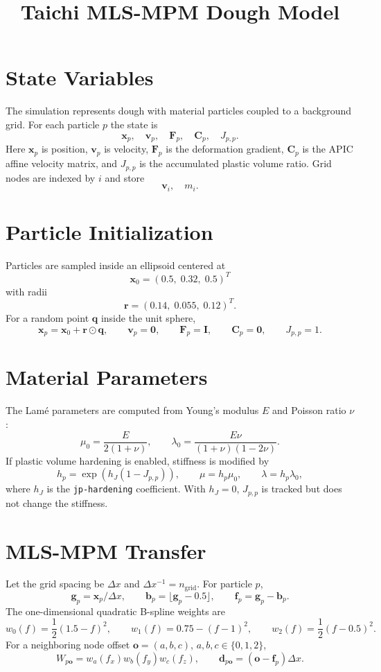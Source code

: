 \documentclass[11pt,a4paper]{article}
\title{Taichi MLS-MPM Dough Model}
\author{}
\date{}
\begin{document}
\maketitle

\section{State Variables}

The simulation represents dough with material particles coupled to a background grid.
For each particle $p$ the state is
\[
  \bm{x}_p,\quad \bm{v}_p,\quad \bm{F}_p,\quad \bm{C}_p,\quad J_{p,p}.
\]
Here $\bm{x}_p$ is position, $\bm{v}_p$ is velocity, $\bm{F}_p$ is the deformation
gradient, $\bm{C}_p$ is the APIC affine velocity matrix, and $J_{p,p}$ is the
accumulated plastic volume ratio. Grid nodes are indexed by $i$ and store
\[
  \bm{v}_i,\quad m_i .
\]

\section{Particle Initialization}

Particles are sampled inside an ellipsoid centered at
\[
  \bm{x}_0 = (0.5,\;0.32,\;0.5)^T
\]
with radii
\[
  \bm{r} = (0.14,\;0.055,\;0.12)^T .
\]
For a random point $\bm{q}$ inside the unit sphere,
\[
  \bm{x}_p = \bm{x}_0 + \bm{r}\odot \bm{q},
  \qquad
  \bm{v}_p = \bm{0},
  \qquad
  \bm{F}_p = \bm{I},
  \qquad
  \bm{C}_p = \bm{0},
  \qquad
  J_{p,p}=1 .
\]

\section{Material Parameters}

The Lam\'e parameters are computed from Young's modulus $E$ and Poisson ratio $\nu$:
\[
  \mu_0 = \frac{E}{2(1+\nu)},
  \qquad
  \lambda_0 = \frac{E\nu}{(1+\nu)(1-2\nu)} .
\]
If plastic volume hardening is enabled, stiffness is modified by
\[
  h_p = \exp\left(h_J(1 - J_{p,p})\right),
  \qquad
  \mu = h_p\mu_0,
  \qquad
  \lambda = h_p\lambda_0 ,
\]
where $h_J$ is the \texttt{jp-hardening} coefficient. With $h_J=0$, $J_{p,p}$
is tracked but does not change the stiffness.

\section{MLS-MPM Transfer}

Let the grid spacing be $\Delta x$ and $\Delta x^{-1} = n_\mathrm{grid}$.
For particle $p$,
\[
  \bm{g}_p = \bm{x}_p / \Delta x,
  \qquad
  \bm{b}_p = \lfloor \bm{g}_p - 0.5 \rfloor,
  \qquad
  \bm{f}_p = \bm{g}_p - \bm{b}_p .
\]
The one-dimensional quadratic B-spline weights are
\[
  w_0(f)=\frac{1}{2}(1.5-f)^2,
  \qquad
  w_1(f)=0.75-(f-1)^2,
  \qquad
  w_2(f)=\frac{1}{2}(f-0.5)^2 .
\]
For a neighboring node offset $\bm{o}=(a,b,c)$, $a,b,c\in\{0,1,2\}$,
\[
  W_{p\bm{o}} = w_a(f_x)w_b(f_y)w_c(f_z),
  \qquad
  \bm{d}_{p\bm{o}} = (\bm{o}-\bm{f}_p)\Delta x .
\]
\end{document}
